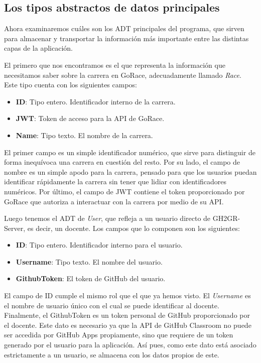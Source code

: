 \subsection{Los tipos abstractos de datos principales}
Ahora examinaremos cuáles son los \acrshort{ADT} principales del programa, que sirven para almacenar y transportar la información más importante entre las distintas capas de la aplicación.

El primero que nos encontramos es el que representa la información que necesitamos saber sobre la carrera en GoRace, adecuadamente llamado \textit{Race}. Este tipo cuenta con los siguientes campos:
\begin{itemize}
    \item \textbf{ID}: Tipo entero. Identificador interno de la carrera.
    \item \textbf{JWT}: Token de acceso para la API de GoRace.
    \item \textbf{Name}: Tipo texto. El nombre de la carrera.
\end{itemize}

El primer campo es un simple identificador numérico, que sirve para distinguir de forma inequívoca una carrera en cuestión del resto. Por su lado, el campo de nombre es un simple apodo para la carrera, pensado para que los usuarios puedan identificar rápidamente la carrera sin tener que lidiar con identificadores numéricos. Por último, el campo de \acrshort{JWT} contiene el token proporcionado por GoRace que autoriza a interactuar con la carrera por medio de su \acrshort{API}.

Luego tenemos el \acrshort{ADT} de \textit{User}, que refleja a un usuario directo de GH2GR-Server, es decir, un docente. Los campos que lo componen son los siguientes:
\begin{itemize}
    \item \textbf{ID}: Tipo entero. Identificador interno para el usuario.
    \item \textbf{Username}: Tipo texto. El nombre del usuario.
    \item \textbf{GithubToken}: El token de GitHub del usuario.
\end{itemize}
El campo de ID cumple el mismo rol que el que ya hemos visto. El \textit{Username} es el nombre de usuario único con el cual se puede identificar al docente. Finalmente, el GithubToken es un token personal de GitHub proporcionado por el docente. Este dato es necesario ya que la \acrshort{API} de GitHub Classroom no puede ser accedida por GitHub Apps propiamente, sino que requiere de un token generado por el usuario para la aplicación\cite{ClassroomAPI}. Así pues, como este dato está asociado estrictamente a un usuario, se almacena con los datos propios de este.


